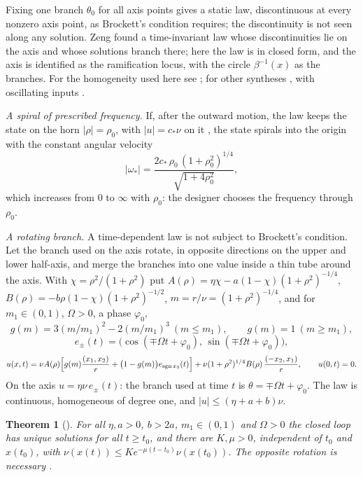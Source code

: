\documentclass[11pt,reqno]{amsart}
\theoremstyle{plain}
\newtheorem*{theorem}{Theorem}
\theoremstyle{remark}
\theoremstyle{definition}
\begin{document}
Fixing one branch $\theta_0$ for all axis points gives a static law, discontinuous at every nonzero axis point, as Brockett's
condition requires; the discontinuity is not seen along any solution. Zeng \cite{Zeng2022} found a time-invariant
law whose discontinuities lie on the axis and whose solutions branch there; here the law is in closed form, and the
axis is identified as the ramification locus, with the circle $\beta^{-1}(x)$ as the branches. For the homogeneity
used here see \cite{Hermes1991,Kawski1990,MCloskeyMurray1997,Polyakov2020}; for other syntheses
\cite{Astolfi1998,CanudasSordalen1992,BlochDrakunov1994,Zeng2019}, with oscillating inputs
\cite{Zuyev2016,ZuyevGrushkovskaya2025}.

\emph{A spiral of prescribed frequency.} If, after the outward motion, the law keeps the state on the horn
$|\rho|=\rho_0$, with $|u|=c_*\nu$ on it \cite[\S4.3]{Companion}, the state spirals into the origin with the constant
angular velocity
\[
  |\omega_*|=\frac{2c_*\,\rho_0\,(1+\rho_0^{2})^{1/4}}{\sqrt{1+4\rho_0^{2}}},
\]
which increases from $0$ to $\infty$ with $\rho_0$: the designer chooses the frequency through $\rho_0$.

\emph{A rotating branch.} A time-dependent law is not subject to Brockett's condition. Let the branch used on the
axis rotate, in opposite directions on the upper and lower half-axis, and merge the branches into one value inside
a thin tube around the axis. With $\chi=\rho^{2}/(1+\rho^{2})$ put
$A(\rho)=\eta\chi-a(1-\chi)(1+\rho^{2})^{-1/4}$, $B(\rho)=-b\rho(1-\chi)(1+\rho^{2})^{-1/2}$, $m=r/\nu=(1+\rho^{2})^{-1/4}$,
and for $m_1\in(0,1)$, $\Omega>0$, a phase $\varphi_0$,
\[
  g(m)=3(m/m_1)^{2}-2(m/m_1)^{3}\ (m\le m_1),\qquad g(m)=1\ (m\ge m_1),
\]
\[
  e_\pm(t)=\bigl(\cos(\mp\Omega t+\varphi_0),\,\sin(\mp\Omega t+\varphi_0)\bigr),
\]
\[
  u(x,t)=\nu A(\rho)\Bigl[g(m)\frac{(x_1,x_2)}{r}+\bigl(1-g(m)\bigr)e_{\operatorname{sgn}x_3}(t)\Bigr]
  +\nu(1+\rho^{2})^{1/4}B(\rho)\,\frac{(-x_2,x_1)}{r},\qquad u(0,t)=0 .
\]
On the axis $u=\eta\nu\,e_\pm(t)$: the branch used at time $t$ is $\theta=\mp\Omega t+\varphi_0$. The law is
continuous, homogeneous of degree one, and $|u|\le(\eta+a+b)\nu$.

\begin{theorem}[{\cite[\S4.4, App.~B]{Companion}}]
For all $\eta,a>0$, $b>2a$, $m_1\in(0,1)$ and $\Omega>0$ the closed loop has unique solutions for all $t\ge t_0$,
and there are $K,\mu>0$, independent of $t_0$ and $x(t_0)$, with $\nu(x(t))\le Ke^{-\mu(t-t_0)}\nu(x(t_0))$.
The opposite rotation is necessary \cite[\S4.4]{Companion}.
\end{theorem}
\end{document}
